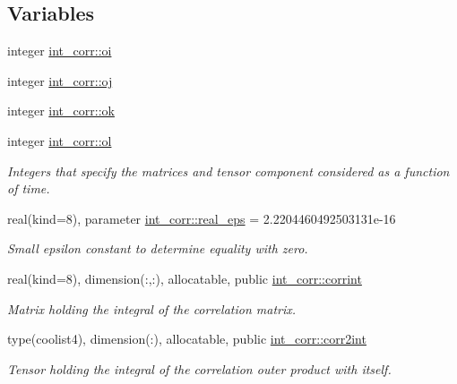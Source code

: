\subsection*{Variables}
\begin{DoxyCompactItemize}
\item 
integer \hyperlink{namespaceint__corr_abddd3a2d3e1bfa4f09d96eaf090e9a95}{int\+\_\+corr\+::oi}
\item 
integer \hyperlink{namespaceint__corr_a114182df2066db340a9c42d9edd1583e}{int\+\_\+corr\+::oj}
\item 
integer \hyperlink{namespaceint__corr_a4af4666df7c0f30de448d09ae160caf4}{int\+\_\+corr\+::ok}
\item 
integer \hyperlink{namespaceint__corr_a3fe0c6bccf317d65552767f983f1cb62}{int\+\_\+corr\+::ol}
\begin{DoxyCompactList}\small\item\em Integers that specify the matrices and tensor component considered as a function of time. \end{DoxyCompactList}\item 
real(kind=8), parameter \hyperlink{namespaceint__corr_ab379731156e2a2dd2d0b11766d766a85}{int\+\_\+corr\+::real\+\_\+eps} = 2.\+2204460492503131e-\/16
\begin{DoxyCompactList}\small\item\em Small epsilon constant to determine equality with zero. \end{DoxyCompactList}\item 
real(kind=8), dimension(\+:,\+:), allocatable, public \hyperlink{namespaceint__corr_ab3c1d22e8c15412a3b535c8301b0c42d}{int\+\_\+corr\+::corrint}
\begin{DoxyCompactList}\small\item\em Matrix holding the integral of the correlation matrix. \end{DoxyCompactList}\item 
type(coolist4), dimension(\+:), allocatable, public \hyperlink{namespaceint__corr_a1422cac2c54e6d7837159fe9fb3a6d6b}{int\+\_\+corr\+::corr2int}
\begin{DoxyCompactList}\small\item\em Tensor holding the integral of the correlation outer product with itself. \end{DoxyCompactList}\end{DoxyCompactItemize}
